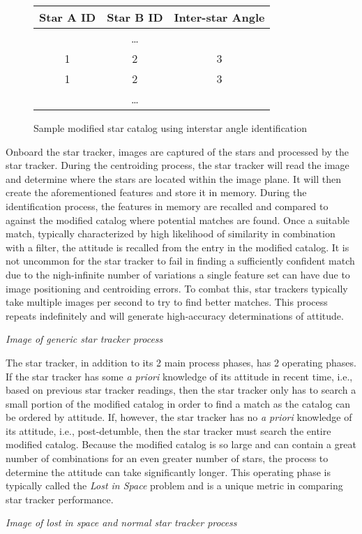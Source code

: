 \begin{figure}
    \begin{adjustbox}{center}
\begin{tabular}{|| c c c ||}
    \hline
    Star A ID & Star B ID & Inter-star Angle \\
    \hline\hline

    & \dots & \\ 
    \hline
    1 & 2 & 3 \\
    \hline
    1 & 2 & 3 \\
    \hline
    & \dots & \\ 
    \hline


\end{tabular}
\end{adjustbox}
\caption{Sample modified star catalog using interstar angle identification}
\end{figure}

\par \qquad Onboard the star tracker, images are captured of the stars and processed by the star tracker.
During the centroiding process, the star tracker will read the image and determine where the stars are located within the image plane.
It will then create the aforementioned features and store it in memory.
During the identification process, the features in memory are recalled and compared to against the modified catalog where potential matches are found.
Once a suitable match, typically characterized by high likelihood of similarity in combination with a filter, the attitude is recalled from the entry in the modified catalog.
It is not uncommon for the star tracker to fail in finding a sufficiently confident match due to the nigh-infinite number of variations a single feature set can have due to image positioning and centroiding errors.
To combat this, star trackers typically take multiple images per second to try to find better matches.
This process repeats indefinitely and will generate high-accuracy determinations of attitude.

\par \qquad \emph{Image of generic star tracker process}

\par \qquad The star tracker, in addition to its 2 main process phases, has 2 operating phases.
If the star tracker has some \emph{a priori} knowledge of its attitude in recent time, i.e., based on previous star tracker readings, then the star tracker only has to search a small portion of the modified catalog in order to find a match as the catalog can be ordered by attitude.
If, however, the star tracker has no \emph{a priori} knowledge of its attitude, i.e., post-detumble, then the star tracker must search the entire modified catalog.
Because the modified catalog is so large and can contain a great number of combinations for an even greater number of stars, the process to determine the attitude can take significantly longer.
This operating phase is typically called the \emph{Lost in Space} problem and is a unique metric in comparing star tracker performance.

\par \qquad \emph{Image of lost in space and normal star tracker process}